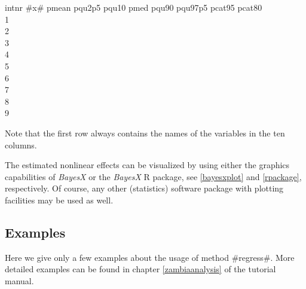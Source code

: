 \footnotesize
intnr  \quad #x# \quad  pmean \quad pqu2p5 \quad pqu10 \quad pmed \quad pqu90 \quad pqu97p5 \quad pcat95 \quad   pcat80 \\
1           \\
2                 \\
3              \\
4               \\
5                \\
6              \\
7                  \\
8             \\
9                

\normalsize

Note that the first row always contains the names of the variables
in the ten columns.

The estimated nonlinear effects can be visualized by using either
the graphics capabilities of {\em BayesX} or the {\it BayesX} R package, see \autoref{bayesxplot} and \autoref{rpackage},
respectively. Of course, any other (statistics) software package
with plotting facilities may be used as well.

\subsection{Examples}

Here we give only a few examples about the usage of method
#regress#. More detailed examples can be found in chapter
\ref{zambiaanalysis} of the tutorial manual.

